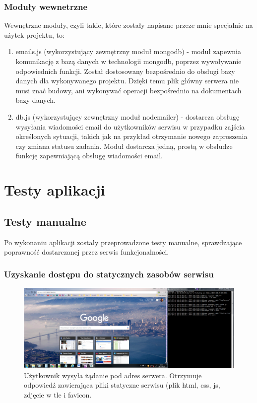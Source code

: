 \documentclass[12pt]{report}
\begin{document}
\subsection{Moduły wewnetrzne}
Wewnętrzne moduły, czyli takie, które zostały napisane przeze mnie specjalnie na użytek projektu, to:
\begin{enumerate}
\item emails.js (wykorzystujący zewnętrzny moduł mongodb) - moduł zapewnia komunikację z bazą danych w technologii mongodb, poprzez wywoływanie odpowiednich funkcji. 
Został dostosowany bezpośrednio do obsługi bazy danych dla wykonywanego projektu. 
Dzięki temu plik główny serwera nie musi znać budowy, ani wykonywać operacji bezpośrednio na dokumentach bazy danych.
\item db.js (wykorzystujący zewnętrzny moduł nodemailer) - dostarcza obsługę wysyłania wiadomości email do użytkowników serwisu w przypadku zajścia określonych sytuacji, takich jak na przykład otrzymanie nowego zaproszenia czy zmiana statusu zadania. Moduł dostarcza jedną, prostą w obsłudze funkcję zapewniającą obsługę wiadomości email. 
\end{enumerate}


\chapter{Testy aplikacji}

\section{Testy manualne}
Po wykonaniu aplikacji zostały przeprowadzone testy manualne, sprawdzające poprawność dostarczanej przez serwis funkcjonalności.
\subsection{Uzyskanie dostępu do statycznych zasobów serwisu}
\begin{figure}[!hb]
\centering
\includegraphics[width=\textwidth,height=\textheight,keepaspectratio]{12.png}
\captionsetup{labelformat=empty}
\caption[]{Użytkownik wysyła żądanie pod adres serwera. 
Otrzymuje odpowiedź zawierająca pliki statyczne serwisu (plik html, css, js, zdjęcie w tle i favicon.}
\end{figure}
\end{document}
